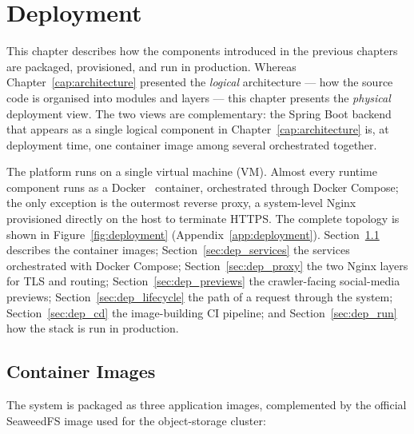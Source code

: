 %
%
\chapter{Deployment} \label{cap:deployment}

This chapter describes how the components introduced in the previous chapters are
packaged, provisioned, and run in production. Whereas Chapter~\ref{cap:architecture}
presented the \emph{logical} architecture --- how the source code is organised into
modules and layers --- this chapter presents the \emph{physical} deployment view. The two
views are complementary: the Spring Boot backend that appears as a single logical component in
Chapter~\ref{cap:architecture} is, at deployment time, one container image among
several orchestrated together.

The platform runs on a single virtual machine (VM). Almost every runtime component
runs as a Docker~\cite{docker} container, orchestrated through Docker Compose; the only exception is
the outermost reverse proxy, a system-level Nginx~\cite{nginx} provisioned directly on the host to
terminate HTTPS. The complete topology is shown in Figure~\ref{fig:deployment}
(Appendix~\ref{app:deployment}). Section~\ref{sec:dep_images} describes the container
images; Section~\ref{sec:dep_services} the services orchestrated with Docker Compose;
Section~\ref{sec:dep_proxy} the two Nginx layers for TLS and routing;
Section~\ref{sec:dep_previews} the crawler-facing social-media previews;
Section~\ref{sec:dep_lifecycle} the path of a request through the system;
Section~\ref{sec:dep_cd} the image-building CI pipeline; and Section~\ref{sec:dep_run} how the
stack is run in production.

\section{Container Images} \label{sec:dep_images}

The system is packaged as three application images, complemented by the official
SeaweedFS image used for the object-storage cluster:


